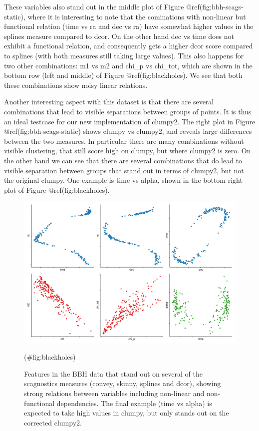 These variables also stand out in the middle plot of Figure
@ref(fig:bbh-scags-static), where it is interesting to note that the
cominations with non-linear but functional relation (time vs ra and dec
vs ra) have somewhat higher values in the splines measure compared to
dcor. On the other hand dec vs time does not exhibit a functional
relation, and consequently gets a higher dcor score compared to splines
(with both measures still taking large values). This also happens for
two other combinations: m1 vs m2 and chi\_p vs chi\_tot, which are shown
in the bottom row (left and middle) of Figure @ref(fig:blackholes). We
see that both these combinations show noisy linear relations.

Another interesting aspect with this dataset is that there are several
combinations that lead to visible separations between groups of points.
It is thus an ideal testcase for our new implementation of clumpy2. The
right plot in Figure @ref(fig:bbh-scags-static) shows clumpy vs clumpy2,
and reveals large differences between the two measures. In particular
there are many combinations without visible clustering, that still score
high on clumpy, but where clumpy2 is zero. On the other hand we can see
that there are several combinations that do lead to visible separation
between groups that stand out in terms of clumpy2, but not the original
clumpy. One example is time vs alpha, shown in the bottom right plot of
Figure @ref(fig:blackholes).

\begin{Schunk}
\begin{figure}
\includegraphics[width=1\linewidth]{mason-lee-laa-cook_files/figure-latex/blackholes-1} \caption[Features in the BBH data that stand out on several of the scagnostics measures (convey, skinny, splines and dcor), showing strong relations between variables including non-linear and non-functional dependencies]{Features in the BBH data that stand out on several of the scagnostics measures (convey, skinny, splines and dcor), showing strong relations between variables including non-linear and non-functional dependencies. The final example (time vs alpha) is expected to take high values in clumpy, but only stands out on the corrected clumpy2.}(\#fig:blackholes)
\end{figure}
\end{Schunk}

